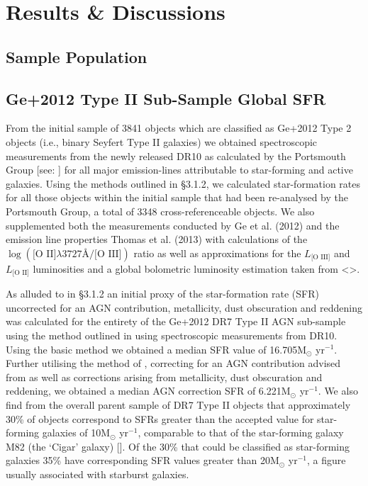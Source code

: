 \section{Results \& Discussions}
\subsection{Sample Population}
\subsection{Ge+2012 Type II Sub-Sample Global SFR}

From the initial sample of 3841 objects which are classified as Ge+2012 Type 2 objects (i.e., binary Seyfert Type II galaxies) we obtained spectroscopic measurements from the newly released DR10 as calculated by the Portsmouth Group [see: \cite{Thomas_2013}] for all major emission-lines attributable to star-forming and active galaxies. Using the methods outlined in §3.1.2, we calculated star-formation rates for all those objects within the initial sample that had been re-analysed by the Portsmouth Group, a total of 3348 cross-referenceable objects. We also supplemented both the measurements conducted by Ge et al. (2012) and the emission line properties Thomas et al. (2013) with calculations of the $\log{(\text{[O II]}{\lambda}3727\text{\AA}\text{/[O III]})}$ ratio as well as approximations for the $L_{\text{[O III]}}$ and $L_{\text{[O II]}}$ luminosities and a global bolometric luminosity estimation taken from <>.         

As alluded to in §3.1.2 an initial proxy of the star-formation rate (SFR) uncorrected for an AGN contribution, metallicity, dust obscuration and reddening was calculated for the entirety of the Ge+2012 DR7 Type II AGN sub-sample using the method outlined in \cite{Kennicutt_1998} using spectroscopic measurements from DR10. Using the basic \cite{Kennicutt_1998} method we obtained a median SFR value of 16.705M$_{\odot}$ yr$^{-1}$. Further utilising the method of \cite{Kewley_2004}, correcting for an AGN contribution advised from \cite{2006ApJ...642..702K} as well as corrections arising from metallicity, dust obscuration and reddening, we obtained a median AGN correction SFR of 6.221M$_{\odot}$ yr$^{-1}$. We also find from the overall parent sample of DR7 Type II objects that approximately 30\% of objects correspond to SFRs greater than the accepted value for star-forming galaxies of 10M$_{\odot}$ yr$^{-1}$, comparable to that of the star-forming galaxy M82 (the ‘Cigar’ galaxy) [\cite{2009ApJ...706.1364F}]. Of the 30\% that could be classified as star-forming galaxies 35\% have corresponding SFR values greater than 20M$_{\odot}$ yr$^{-1}$, a figure usually associated with starburst galaxies.


